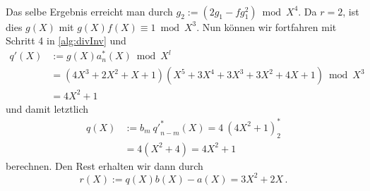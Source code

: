 \begin{beispiel}
\begin{tabular}{lrll}
  \end{tabular}\\
  Das selbe Ergebnis erreicht man durch $g_2 := (2g_1 - fg_1^2) \bmod X^4$.
  Da $r=2$, ist dies $g(X)$ mit $g(X)f(X) \equiv 1 \bmod X^3$.
  Nun können wir fortfahren mit Schritt 4 in \autoref{alg:divInv} und 
  \begin{align*}
    q'(X) &:= g(X) a^\ast_n(X) \bmod X^l\\
    &= (4X^3+2X^2+X+1)(X^5+3X^4+3X^3 + 3X^2 + 4X + 1) \bmod X^3\\
    &= 4X^2 + 1
  \end{align*}
  und damit letztlich
  \begin{align*}
    q(X) &:= b_m\ {q'}^\ast_{n-m}(X) = 4\ (4X^2+1)^\ast_{2} \\
    &= 4 (X^2 + 4) = 4X^2 + 1
  \end{align*}
  berechnen. Den Rest erhalten wir dann durch 
  \[ r(X) := q(X)b(X) - a(X) = 3X^2 + 2X\,. \]
\end{beispiel}




